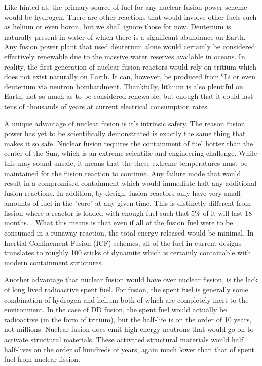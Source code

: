 		Like hinted at, the primary source of fuel for any nuclear fusion power scheme would be hydrogen. There are other reactions that would involve other fuels such as helium or even boron, but we shall ignore those for now. \cite{bibid} Deuterium is naturally present in water of which there is a significant abundance on Earth. \cite{bibid} Any fusion power plant that used deuterium alone would certainly be considered effectively renewable due to the massive water reserves available in oceans. In reality, the first generation of nuclear fusion reactors would rely on tritium which does not exist naturally on Earth. It can, however, be produced from $^6$Li or even deuterium via neutron bombardment. \cite{bibid} Thankfully, lithium is also plentiful on Earth, not so much as to be considered renewable, but enough that it could last tens of thousands of years at current electrical consumption rates. \cite{bibid} 
		
		A unique advantage of nuclear fusion is it's intrinsic safety. The reason fusion power has yet to be scientifically demonstrated is exactly the same thing that makes it so safe. Nuclear fusion requires the containment of fuel hotter than the center of the Sun, which is an extreme scientific and engineering challenge. \cite{bibid} While this may sound unsafe, it means that the these extreme temperatures must be maintained for the fusion reaction to continue. Any failure mode that would result in a compromised containment which would immediate halt any additional fusion reactions. In addition, by design, fusion reactors only have very small amounts of fuel in the "core" at any given time. This is distinctly different from fission where a reactor is loaded with enough fuel such that 5\% of it will last 18 months. \cite{bibid}.  What this means is that even if all of the fusion fuel were to be consumed in a runaway reaction, the total energy released would be minimal. In Inertial Confinement Fusion (ICF) schemes, all of the fuel in current designs translates to roughly 100 sticks of dynamite which is certainly containable with modern containment structures. \cite{bibid}
		
		Another advantage that nuclear fusion would have over nuclear fission, is the lack of long lived radioactive spent fuel. For fusion, the spent fuel is generally some combination of hydrogen and helium both of which are completely inert to the environment. \cite{bibid} In the case of DD fusion, the spent fuel would actually be radioactive (in the form of tritium), but the half-life is on the order of 10 years, not millions. \cite{bibid} Nuclear fusion does emit high energy neutrons that would go on to activate structural materials. These activated structural materials would half half-lives on the order of hundreds of years, again much lower than that of spent fuel from nuclear fission. \cite{bibid}
		
